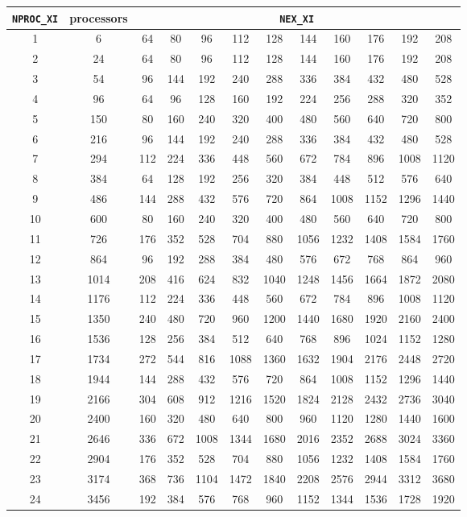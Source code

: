 \clearpage
\noindent \begin{center}
\label{table:nex}
\begin{longtable}{|c|c|c|c|c|c|c|c|c|c|c|c|}
\hline
{\texttt{NPROC\_XI}} & processors & \multicolumn{10}{c|}{{\texttt{NEX\_XI}}}\tabularnewline
\hline
\endhead
\hline
1 & 6 & 64 & 80 & 96 & 112 & 128 & 144 & 160 & 176 & 192 & 208\tabularnewline
\hline
2 & 24 & 64 & 80 & 96 & 112 & 128 & 144 & 160 & 176 & 192 & 208\tabularnewline
\hline
3 & 54 & 96 & 144 & 192 & 240 & 288 & 336 & 384 & 432 & 480 & 528\tabularnewline
\hline
4 & 96 & 64 & 96 & 128 & 160 & 192 & 224 & 256 & 288 & 320 & 352\tabularnewline
\hline
5 & 150 & 80 & 160 & 240 & 320 & 400 & 480 & 560 & 640 & 720 & 800\tabularnewline
\hline
6 & 216 & 96 & 144 & 192 & 240 & 288 & 336 & 384 & 432 & 480 & 528\tabularnewline
\hline
7 & 294 & 112 & 224 & 336 & 448 & 560 & 672 & 784 & 896 & 1008 & 1120\tabularnewline
\hline
8 & 384 & 64 & 128 & 192 & 256 & 320 & 384 & 448 & 512 & 576 & 640\tabularnewline
\hline
9 & 486 & 144 & 288 & 432 & 576 & 720 & 864 & 1008 & 1152 & 1296 & 1440\tabularnewline
\hline
10 & 600 & 80 & 160 & 240 & 320 & 400 & 480 & 560 & 640 & 720 & 800\tabularnewline
\hline
11 & 726 & 176 & 352 & 528 & 704 & 880 & 1056 & 1232 & 1408 & 1584 & 1760\tabularnewline
\hline
12 & 864 & 96 & 192 & 288 & 384 & 480 & 576 & 672 & 768 & 864 & 960\tabularnewline
\hline
13 & 1014 & 208 & 416 & 624 & 832 & 1040 & 1248 & 1456 & 1664 & 1872 & 2080\tabularnewline
\hline
14 & 1176 & 112 & 224 & 336 & 448 & 560 & 672 & 784 & 896 & 1008 & 1120\tabularnewline
\hline
15 & 1350 & 240 & 480 & 720 & 960 & 1200 & 1440 & 1680 & 1920 & 2160 & 2400\tabularnewline
\hline
16 & 1536 & 128 & 256 & 384 & 512 & 640 & 768 & 896 & 1024 & 1152 & 1280\tabularnewline
\hline
17 & 1734 & 272 & 544 & 816 & 1088 & 1360 & 1632 & 1904 & 2176 & 2448 & 2720\tabularnewline
\hline
18 & 1944 & 144 & 288 & 432 & 576 & 720 & 864 & 1008 & 1152 & 1296 & 1440\tabularnewline
\hline
19 & 2166 & 304 & 608 & 912 & 1216 & 1520 & 1824 & 2128 & 2432 & 2736 & 3040\tabularnewline
\hline
20 & 2400 & 160 & 320 & 480 & 640 & 800 & 960 & 1120 & 1280 & 1440 & 1600\tabularnewline
\hline
21 & 2646 & 336 & 672 & 1008 & 1344 & 1680 & 2016 & 2352 & 2688 & 3024 & 3360\tabularnewline
\hline
22 & 2904 & 176 & 352 & 528 & 704 & 880 & 1056 & 1232 & 1408 & 1584 & 1760\tabularnewline
\hline
23 & 3174 & 368 & 736 & 1104 & 1472 & 1840 & 2208 & 2576 & 2944 & 3312 & 3680\tabularnewline
\hline
24 & 3456 & 192 & 384 & 576 & 768 & 960 & 1152 & 1344 & 1536 & 1728 & 1920\tabularnewline

\end{longtable}
\end{center}
